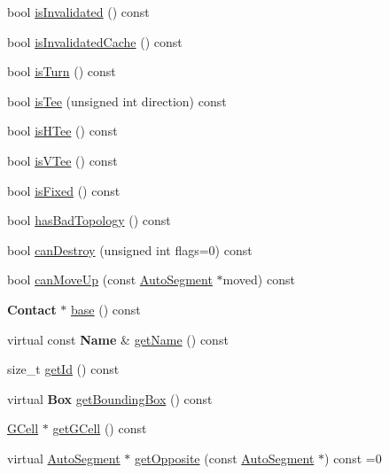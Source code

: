 \begin{DoxyCompactItemize}
\item 
bool \hyperlink{classKatabatic_1_1AutoContact_ac540608485240ff88970131ebc02c1ab}{is\+Invalidated} () const
\item 
bool \hyperlink{classKatabatic_1_1AutoContact_a6d1120fc8800af5d269e72ce5c3ba629}{is\+Invalidated\+Cache} () const
\item 
bool \hyperlink{classKatabatic_1_1AutoContact_a249530ac086dbf92f981887cc633facf}{is\+Turn} () const
\item 
bool \hyperlink{classKatabatic_1_1AutoContact_ae4ba7bc2888f990818cbdb808260c47e}{is\+Tee} (unsigned int direction) const
\item 
bool \hyperlink{classKatabatic_1_1AutoContact_aeb66931d535cbd3d0f9bc525968e15f5}{is\+H\+Tee} () const
\item 
bool \hyperlink{classKatabatic_1_1AutoContact_ae38846b6213cccbc6f008b175b4604b0}{is\+V\+Tee} () const
\item 
bool \hyperlink{classKatabatic_1_1AutoContact_afd7362b850709bed8b61c1aa22399f97}{is\+Fixed} () const
\item 
bool \hyperlink{classKatabatic_1_1AutoContact_acc77b6de9050a86dc41e25888c8f81f6}{has\+Bad\+Topology} () const
\item 
bool \hyperlink{classKatabatic_1_1AutoContact_af783b79a1398450e28e2ea55c3eb8476}{can\+Destroy} (unsigned int flags=0) const
\item 
bool \hyperlink{classKatabatic_1_1AutoContact_a69d29e4d230a0111ca18e6e661a48f8b}{can\+Move\+Up} (const \hyperlink{classKatabatic_1_1AutoSegment}{Auto\+Segment} $\ast$moved) const
\item 
\textbf{ Contact} $\ast$ \hyperlink{classKatabatic_1_1AutoContact_ab422116c7edfacedd31711c96e3ec95b}{base} () const
\item 
virtual const \textbf{ Name} \& \hyperlink{classKatabatic_1_1AutoContact_a9e76ae5cee9320b65251387419c9432b}{get\+Name} () const
\item 
size\+\_\+t \hyperlink{classKatabatic_1_1AutoContact_a1e57c42301b9e58648863e7d5dc055e7}{get\+Id} () const
\item 
virtual \textbf{ Box} \hyperlink{classKatabatic_1_1AutoContact_ab5d8bf98ab5af6fcfebea1b9f446d5d7}{get\+Bounding\+Box} () const
\item 
\hyperlink{classKatabatic_1_1GCell}{G\+Cell} $\ast$ \hyperlink{classKatabatic_1_1AutoContact_a819cf639562a031a1e2e061fe1293d66}{get\+G\+Cell} () const
\item 
virtual \hyperlink{classKatabatic_1_1AutoSegment}{Auto\+Segment} $\ast$ \hyperlink{classKatabatic_1_1AutoContact_a48ab1d3bdf85712e4784ef83ef136939}{get\+Opposite} (const \hyperlink{classKatabatic_1_1AutoSegment}{Auto\+Segment} $\ast$) const =0

\end{DoxyCompactItemize}
